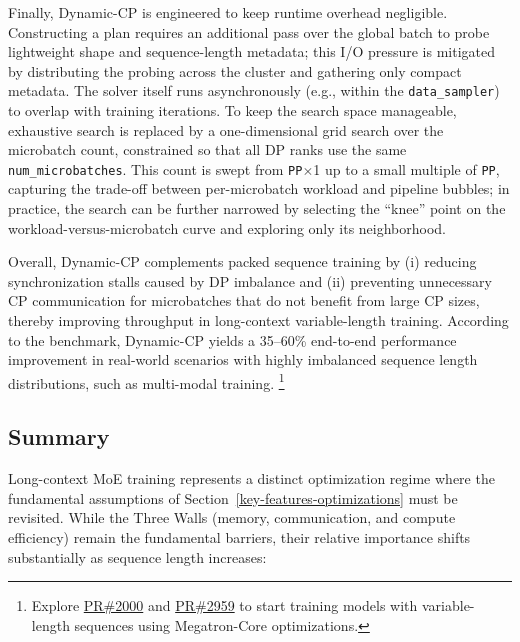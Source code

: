 Finally, Dynamic-CP is engineered to keep runtime overhead negligible. Constructing a plan requires an additional pass over the global batch to probe lightweight shape and sequence-length metadata; this I/O pressure is mitigated by distributing the probing across the cluster and gathering only compact metadata. The solver itself runs asynchronously (e.g., within the \texttt{data\_sampler}) to overlap with training iterations. To keep the search space manageable, exhaustive search is replaced by a one-dimensional grid search over the microbatch count, constrained so that all DP ranks use the same \texttt{num\_microbatches}. This count is swept from \texttt{PP}$\times$1 up to a small multiple of \texttt{PP}, capturing the trade-off between per-microbatch workload and pipeline bubbles; in practice, the search can be further narrowed by selecting the ``knee'' point on the workload-versus-microbatch curve and exploring only its neighborhood.


Overall, Dynamic-CP complements packed sequence training by (i) reducing synchronization stalls caused by DP imbalance and (ii) preventing unnecessary CP communication for microbatches that do not benefit from large CP sizes, thereby improving throughput in long-context variable-length training. According to the benchmark, Dynamic-CP yields a 35--60\% end-to-end performance improvement in real-world scenarios with highly imbalanced sequence length distributions, such as multi-modal training. \footnote{Explore \href{https://github.com/NVIDIA/Megatron-LM/pull/2000}{PR\#2000} and \href{https://github.com/NVIDIA/Megatron-LM/pull/2959}{PR\#2959} to start training models with variable-length sequences using Megatron-Core optimizations.}

\subsection{Summary}

Long-context MoE training represents a distinct optimization regime where the fundamental assumptions of Section~\ref{key-features-optimizations} must be revisited. While the Three Walls (memory, communication, and compute efficiency) remain the fundamental barriers, their relative importance shifts substantially as sequence length increases:

